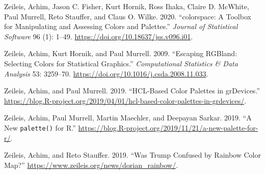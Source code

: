 \begin{CSLReferences}{1}{0}
\leavevmode{}%
Zeileis, Achim, Jason C. Fisher, Kurt Hornik, Ross Ihaka, Claire D. McWhite, Paul Murrell, Reto Stauffer, and Claus O. Wilke. 2020. {``{colorspace}: A Toolbox for Manipulating and Assessing Colors and Palettes.''} \emph{Journal of Statistical Software} 96 (1): 1--49. \url{https://doi.org/10.18637/jss.v096.i01}.

\leavevmode{}%
Zeileis, Achim, Kurt Hornik, and Paul Murrell. 2009. {``Escaping {RGB}land: Selecting Colors for Statistical Graphics.''} \emph{Computational Statistics \& Data Analysis} 53: 3259--70. \url{https://doi.org/10.1016/j.csda.2008.11.033}.

\leavevmode{}%
Zeileis, Achim, and Paul Murrell. 2019. {``{HCL}-Based Color Palettes in {grDevices}.''} \url{https://blog.R-project.org/2019/04/01/hcl-based-color-palettes-in-grdevices/}.

\leavevmode{}%
Zeileis, Achim, Paul Murrell, Martin Maechler, and Deepayan Sarkar. 2019. {``A New \texttt{palette()} for {R}.''} \url{https://blog.R-project.org/2019/11/21/a-new-palette-for-r/}.

\leavevmode{}%
Zeileis, Achim, and Reto Stauffer. 2019. {``Was {T}rump Confused by Rainbow Color Map?''} \url{https://www.zeileis.org/news/dorian_rainbow/}.

\end{CSLReferences}


\address{%
Achim Zeileis\\
Universität Innsbruck\\%
Department of Statistics\\
%
\url{https://www.zeileis.org/}\\%
\textit{ORCiD: \href{https://orcid.org/0000-0003-0918-3766}{0000-0003-0918-3766}}\\%
\href{mailto:Achim.Zeileis@R-project.org}{\nolinkurl{Achim.Zeileis@R-project.org}}%
}

\address{%
Paul Murrell\\
University of Auckland\\%
Department of Statistics\\
%
\url{https://www.stat.auckland.ac.nz/~paul/}\\%
\textit{ORCiD: \href{https://orcid.org/0000-0002-3224-8858}{0000-0002-3224-8858}}\\%
\href{mailto:paul@stat.auckland.ac.nz}{\nolinkurl{paul@stat.auckland.ac.nz}}%
}
